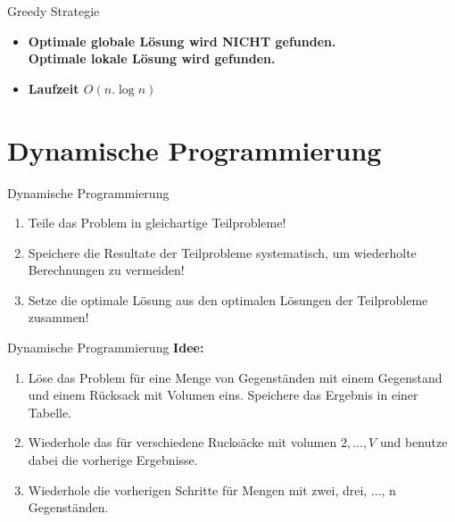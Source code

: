\documentclass[10pt]{beamer}
\begin{document}
\begin{frame}[fragile]{Greedy Strategie}
	\begin{itemize}[<+- | alert@+>]
		\item[] \begin{center}
			\textbf{Optimale globale Lösung wird \Large{NICHT} \normalsize{gefunden}.}\\
			\textbf{Optimale lokale Lösung wird gefunden.}
		\end{center}
		\vspace{1cm}
		\item[] \begin{center}
			\textbf{Laufzeit $O(n. \log n)$}
		\end{center}
	\end{itemize}
\end{frame}

\section*{Dynamische Programmierung}

\begin{frame}[fragile]{Dynamische Programmierung}
	\begin{enumerate}[<+- | alert@+>]
		\item Teile das Problem in gleichartige Teilprobleme!
		\item Speichere die Resultate der Teilprobleme systematisch, um wiederholte Berechnungen zu vermeiden!
		\item Setze die optimale Lösung aus den optimalen Lösungen der Teilprobleme zusammen!
	\end{enumerate}
\end{frame}

\begin{frame}[fragile]{Dynamische Programmierung}
	\textbf{Idee:}
	\begin{enumerate}[<+- | alert@+>]
		\item Löse das Problem für eine Menge von Gegenständen mit einem Gegenstand und einem Rücksack mit Volumen eins. Speichere das Ergebnis in einer Tabelle.
		\item Wiederhole das für verschiedene Rucksäcke mit volumen $2, ..., V$ und benutze dabei die vorherige Ergebnisse.
		\item Wiederhole die vorherigen Schritte für Mengen mit zwei, drei, ..., n Gegenständen.		
	\end{enumerate}
\end{frame}
\end{document}
